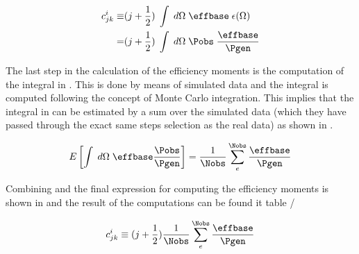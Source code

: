 \begin{center}
\begin{align}
   c^i_{jk}  \equiv &(j + \frac{1}{2}) \; \int \; d\Omega \; \effbase \; \epsilon(\Omega) \nonumber \\ 
                 = &(j + \frac{1}{2}) \; \int \; d\Omega \; \Pobs \; \frac{\effbase}{\Pgen}  
  \label{eff_moms_def}
\end{align}
\end{center}

\noindent The last step in the calculation of the efficiency moments is the computation of the integral in .
This is done by means of simulated data and the integral is computed following the concept of Monte Carlo integration. This implies
that the integral in  can be estimated by a sum over the simulated data (which they have passed through the exact
same steps selection as the real data) as shown in .   

\begin{center}
\begin{equation}
  E\left[ \int \; d\Omega \; \effbase \frac{\Pobs}{\Pgen} \right] = \frac{1}{\Nobs} \sum_e^{\Nobs} \frac{\effbase}{\Pgen}  
  \label{eff_moms_calc}
\end{equation}
\end{center}

\noindent Combining  and  the final expression for computing the efficiency moments is shown
in  and the result of the computations can be found it table /  

\begin{center}
\begin{equation}
 c^i_{jk} \equiv (j + \frac{1}{2})  \frac{1}{\Nobs} \sum_e^{\Nobs} \frac{\effbase}{\Pgen}  
  \label{eff_moms_calc_final}
\end{equation}
\end{center}

